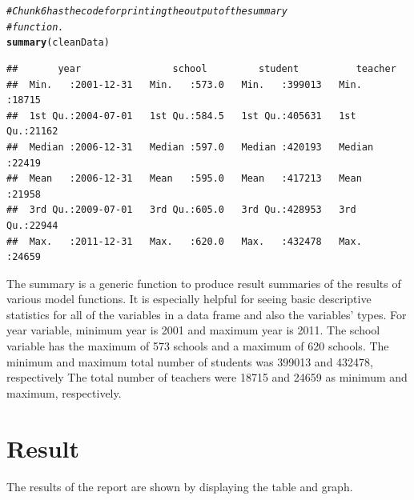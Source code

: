 \documentclass{article}\usepackage[]{graphicx}\usepackage[]{color}
\makeatletter
\newcommand{\hlcom}[1]{\textcolor[rgb]{0.678,0.584,0.686}{\textit{#1}}}%
\newcommand{\hlstd}[1]{\textcolor[rgb]{0.345,0.345,0.345}{#1}}%
\newcommand{\hlkwd}[1]{\textcolor[rgb]{0.737,0.353,0.396}{\textbf{#1}}}%
\newenvironment{kframe}{%
 \def\at@end@of@kframe{}%
 \ifinner\ifhmode%
  \def\at@end@of@kframe{\end{minipage}}%
  \begin{minipage}{\columnwidth}%
 \fi\fi%
 \def\FrameCommand##1{\hskip\@totalleftmargin \hskip-\fboxsep
 \colorbox{shadecolor}{##1}\hskip-\fboxsep
     \hskip-\linewidth \hskip-\@totalleftmargin \hskip\columnwidth}%
 \MakeFramed {\advance\hsize-\width
   \@totalleftmargin\z@ \linewidth\hsize
   \@setminipage}}%
 {\par\unskip\endMakeFramed%
 \at@end@of@kframe}
\newenvironment{knitrout}{}{} %
\makeatother
\begin{document}
\begin{enumerate}
\begin{knitrout}
\color{fgcolor}\begin{kframe}
\begin{alltt}
\hlcom{# Chunk6 has the code for printing the output of the summary}
\hlcom{# function.}
\hlkwd{summary}\hlstd{(cleanData)}
\end{alltt}
\begin{verbatim}
##       year                school         student          teacher     
##  Min.   :2001-12-31   Min.   :573.0   Min.   :399013   Min.   :18715  
##  1st Qu.:2004-07-01   1st Qu.:584.5   1st Qu.:405631   1st Qu.:21162  
##  Median :2006-12-31   Median :597.0   Median :420193   Median :22419  
##  Mean   :2006-12-31   Mean   :595.0   Mean   :417213   Mean   :21958  
##  3rd Qu.:2009-07-01   3rd Qu.:605.0   3rd Qu.:428953   3rd Qu.:22944  
##  Max.   :2011-12-31   Max.   :620.0   Max.   :432478   Max.   :24659
\end{verbatim}
\end{kframe}
\end{knitrout}

The summary is a generic function to produce result summaries of the results of various model functions. It is especially helpful for seeing basic descriptive statistics for all of the variables in a data frame and also the variables’ types. For year variable, minimum year is 2001 and maximum year is 2011. The school variable has the maximum of 573 schools  and a maximum of 620 schools. The minimum and maximum total number of students was 399013 and 432478, respectively The total number of teachers were 18715 and 24659 as minimum and maximum, respectively.

\end {enumerate}

\section {Result}
The results of the report are shown by displaying the table and graph.
\end{document}
